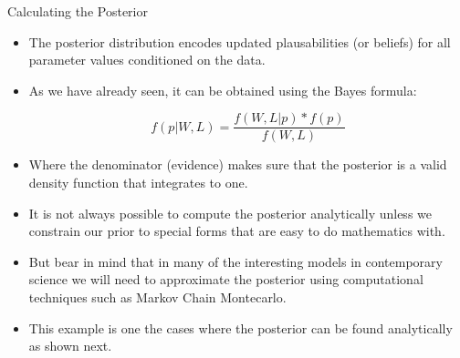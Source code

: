 \documentclass[handout]{beamer}
\begin{document}
\begin{frame}{Calculating the Posterior}
\scriptsize{

\begin{itemize}

\item The posterior distribution encodes updated plausabilities (or beliefs) for all parameter values conditioned on the data.
\item As we have already seen, it can be obtained using the Bayes formula:

\begin{displaymath}
 f(p|W,L) = \frac{f(W,L|p)* f(p)}{f(W,L)}
\end{displaymath}

\item Where the denominator (evidence) makes sure that the posterior is a valid density function that integrates to one.

\item It is not always possible to compute the posterior analytically unless we constrain our prior to special forms that are easy to do mathematics with.

\item But bear in mind that in many of the interesting models in contemporary science we will need to approximate the posterior using computational techniques such as Markov Chain Montecarlo. 

\item This example is one the cases where the posterior can be found analytically as shown next.

\end{itemize}

} 


\end{frame}
\end{document}
